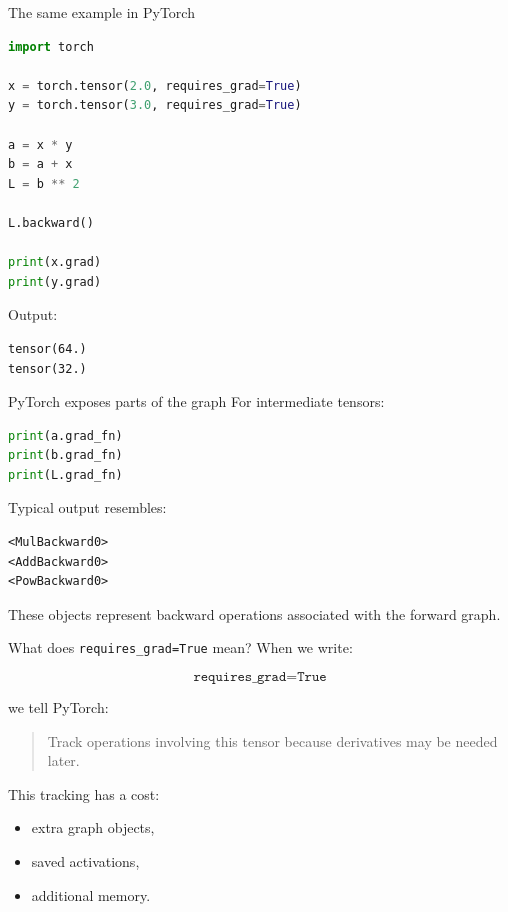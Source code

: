 \documentclass[10pt,aspectratio=169]{beamer}
\begin{document}
\begin{frame}[fragile,t]{The same example in PyTorch}
\begin{lstlisting}[language=Python]
import torch

x = torch.tensor(2.0, requires_grad=True)
y = torch.tensor(3.0, requires_grad=True)

a = x * y
b = a + x
L = b ** 2

L.backward()

print(x.grad)
print(y.grad)
\end{lstlisting}

Output:

\begin{lstlisting}
tensor(64.)
tensor(32.)
\end{lstlisting}
\end{frame}

\begin{frame}[fragile,t]{PyTorch exposes parts of the graph}
For intermediate tensors:

\begin{lstlisting}[language=Python]
print(a.grad_fn)
print(b.grad_fn)
print(L.grad_fn)
\end{lstlisting}

Typical output resembles:

\begin{lstlisting}
<MulBackward0>
<AddBackward0>
<PowBackward0>
\end{lstlisting}

These objects represent backward operations associated with the forward graph.
\end{frame}

\begin{frame}[t]{What does \texttt{requires\_grad=True} mean?}
When we write:

\[
\texttt{requires\_grad=True}
\]

we tell PyTorch:

\begin{quote}
Track operations involving this tensor because derivatives may be needed later.
\end{quote}

This tracking has a cost:

\begin{itemize}
    \item extra graph objects,
    \item saved activations,
    \item additional memory.
\end{itemize}
\end{frame}
\end{document}
